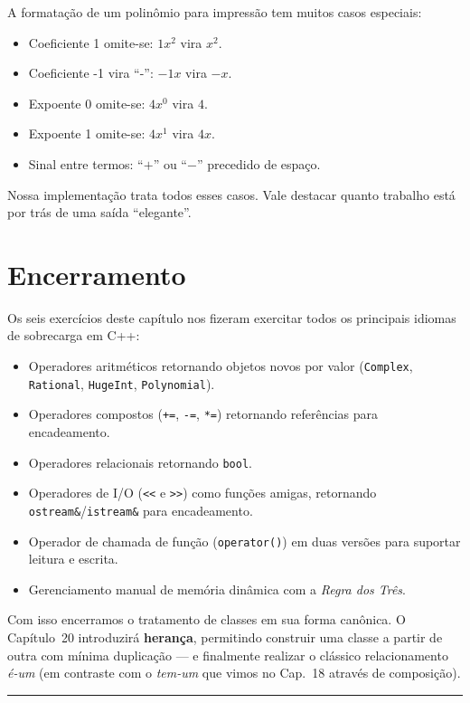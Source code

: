 \documentclass[11pt,a4paper]{article}
\begin{document}
\begin{boaprat}
A formata\c{c}\~ao de um polin\^omio para impress\~ao tem muitos casos especiais:
\begin{itemize}[leftmargin=*,itemsep=0pt]
  \item Coeficiente 1 omite-se: $1x^2$ vira $x^2$.
  \item Coeficiente -1 vira ``-'': $-1x$ vira $-x$.
  \item Expoente 0 omite-se: $4x^0$ vira $4$.
  \item Expoente 1 omite-se: $4x^1$ vira $4x$.
  \item Sinal entre termos: ``$+$'' ou ``$-$'' precedido de espa\c{c}o.
\end{itemize}
Nossa implementa\c{c}\~ao trata todos esses casos. Vale destacar quanto trabalho est\'a por tr\'as de uma sa\'ida ``elegante''.
\end{boaprat}

\section*{Encerramento}

Os seis exerc\'icios deste cap\'itulo nos fizeram exercitar todos os principais idiomas de sobrecarga em C++:

\begin{itemize}[leftmargin=*,itemsep=0pt]
  \item Operadores aritm\'eticos retornando objetos novos por valor (\texttt{Complex}, \texttt{Rational}, \texttt{HugeInt}, \texttt{Polynomial}).
  \item Operadores compostos (\texttt{+=}, \texttt{-=}, \texttt{*=}) retornando refer\^encias para encadeamento.
  \item Operadores relacionais retornando \texttt{bool}.
  \item Operadores de I/O (\texttt{<<} e \texttt{>>}) como fun\c{c}\~oes amigas, retornando \texttt{ostream\&}/\texttt{istream\&} para encadeamento.
  \item Operador de chamada de fun\c{c}\~ao (\texttt{operator()}) em duas vers\~oes para suportar leitura e escrita.
  \item Gerenciamento manual de mem\'oria din\^amica com a \emph{Regra dos Tr\^es}.
\end{itemize}

Com isso encerramos o tratamento de classes em sua forma can\^onica. O Cap\'itulo~20 introduzir\'a \textbf{heran\c{c}a}, permitindo construir uma classe a partir de outra com m\'inima duplica\c{c}\~ao --- e finalmente realizar o cl\'assico relacionamento \emph{\'e-um} (em contraste com o \emph{tem-um} que vimos no Cap.~18 atrav\'es de composi\c{c}\~ao).

\vspace{1em}
\begin{center}\rule{0.5\textwidth}{0.4pt}\end{center}
\end{document}
